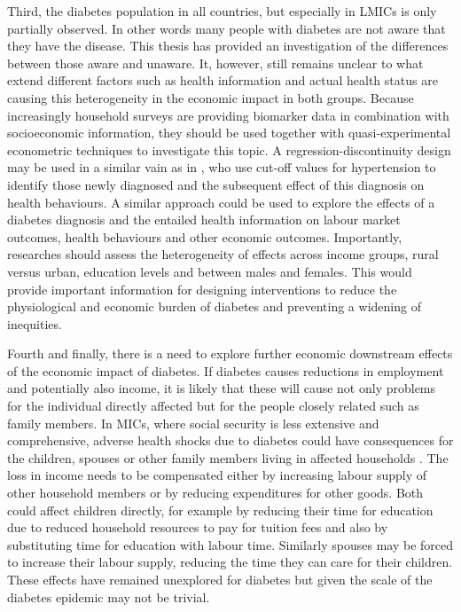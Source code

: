 Third, the diabetes population in all countries, but especially in \acp{LMIC} is only partially observed. In other words many people with diabetes are not aware that they have the disease. This thesis has provided an investigation of the differences between those aware and unaware. It, however, still remains unclear to what extend different factors such as health information and actual health status are causing this heterogeneity in the economic impact in both groups. Because increasingly household surveys are providing biomarker data in combination with socioeconomic information, they should be used together with quasi-experimental econometric techniques to investigate this topic. A regression-discontinuity design may be used in a similar vain as in \textcite{Zhao2013a}, who use cut-off values for hypertension to identify those newly diagnosed and the subsequent effect of this diagnosis on health behaviours. A similar approach could be used to explore the effects of a diabetes diagnosis and the entailed health information on labour market outcomes, health behaviours and other economic outcomes. Importantly, researches should assess the heterogeneity of effects across income groups, rural versus urban, education levels and between males and females. This would provide important information for designing interventions to reduce the physiological and economic burden of diabetes and preventing a widening of inequities.

Fourth and finally, there is a need to explore further economic downstream effects of the economic impact of diabetes. If diabetes causes reductions in employment and potentially also income, it is likely that these will cause not only problems for the individual directly affected but for the people closely related such as family members. In \acp{MIC}, where social security is less extensive and comprehensive, adverse health shocks due to diabetes could have consequences for the children, spouses or other family members living in affected households \parencite{Alam2014}. The loss in income needs to be compensated either by increasing labour supply of other household members or by reducing expenditures for other goods. Both could affect children directly, for example by reducing their time for education due to reduced household resources to pay for tuition fees and also by substituting time for education with labour time. Similarly spouses may be forced to increase their labour supply, reducing the time they can care for their children. These effects have remained unexplored for diabetes but given the scale of the diabetes epidemic may not be trivial.

